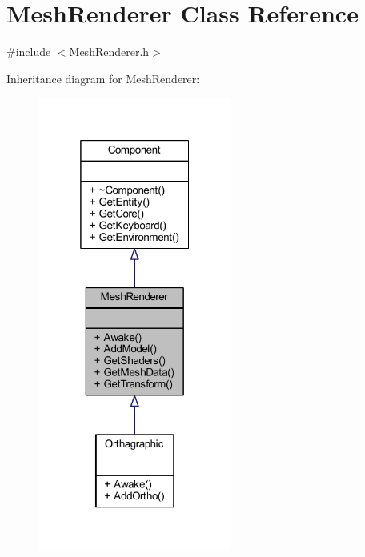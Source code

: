 \hypertarget{class_mesh_renderer}{}\section{Mesh\+Renderer Class Reference}
\label{class_mesh_renderer}


{\ttfamily \#include $<$Mesh\+Renderer.\+h$>$}



Inheritance diagram for Mesh\+Renderer\+:
\nopagebreak
\begin{figure}[H]
\begin{center}
\leavevmode
\includegraphics[width=181pt]{class_mesh_renderer__inherit__graph}
\end{center}
\end{figure}


